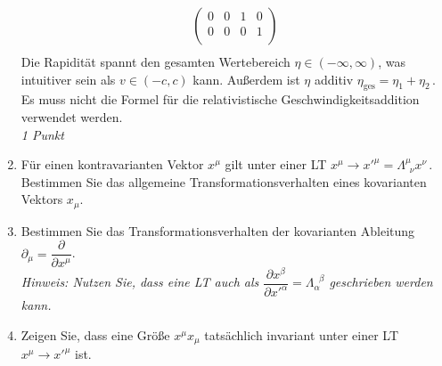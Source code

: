 \documentclass{exercise}
\begin{document}
\begin{enumerate}
{\begin{align*}
\begin{pmatrix}
                0 & 0 & 1 & 0 \\
                0 & 0 & 0 & 1 \\
            \end{pmatrix} \\
        \end{align*}
        Die Rapidität spannt den gesamten Wertebereich $\eta \in \left(-\infty, \infty\right)$, was intuitiver sein als $v \in \left(-c, c\right)$ kann.
        Außerdem ist $\eta$ additiv $\eta_\text{ges} = \eta_1 + \eta_2$\,.
        Es muss nicht die Formel für die relativistische Geschwindigkeitsaddition verwendet werden.\\
        \textit{1 Punkt}
        }
        \item Für einen kontravarianten Vektor $x^{\mu}$ gilt unter einer LT $x^{\mu} \rightarrow x'^{\mu} = \Lambda_{\phantom{\nu} \nu}^\mu x^{\nu}\,.$
        Bestimmen Sie das allgemeine Transformationsverhalten eines kovarianten Vektors $x_{\mu}$.
        \item Bestimmen Sie das Transformationsverhalten der kovarianten Ableitung $\partial_\mu = \dfrac{\partial}{\partial x^\mu}$.\\
        \textit{Hinweis: Nutzen Sie, dass eine LT auch als $\dfrac{\partial x^\beta}{\partial x'^\alpha} = \Lambda^{\phantom{\beta} \beta}_\alpha$ geschrieben werden kann.}
        \item Zeigen Sie, dass eine Größe $x^\mu x_\mu$ tatsächlich invariant unter einer LT $x^\mu \rightarrow x'^\mu$ ist.

\end{enumerate}
\end{document}
